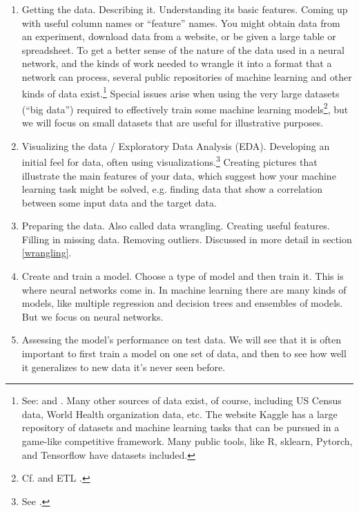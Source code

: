 \begin{enumerate}
\item Getting the data. Describing it. Understanding its basic features. Coming up with useful column names or ``feature'' names. You might obtain data from an experiment, download data from a website, or be given a large table or spreadsheet. To get a better sense of the nature of the data used in a neural network, and the kinds of work needed to wrangle it into a format that a network can process, several public repositories of machine learning and other kinds of data exist.\footnote{See:  and . Many other sources of data exist, of course, including US Census data, World Health organization data, etc. The website Kaggle has a large repository of datasets and machine learning tasks that can be pursued in a game-like competitive framework. Many public tools, like R, sklearn, Pytorch, and Tensorflow have datasets included.}  Special issues arise when using the very large datasets (``big data'') required to effectively train some machine learning models\footnote{Cf.  and ETL .}, but we will focus on small datasets that are useful for illustrative purposes. 
\item Visualizing the data / Exploratory Data Analysis (EDA). Developing an initial feel for  data, often using visualizations.\footnote{See .} Creating pictures that illustrate the main features of your data, which suggest how your machine learning task might be solved, e.g. finding data that show a correlation between some input data and the target data.
\item Preparing the data. Also called data wrangling. Creating useful features. Filling in missing data. Removing outliers. Discussed in more detail in section \ref{wrangling}.
\item Create and train a model. Choose a type of model and then train it. This is where  neural networks come in. In machine learning there are many kinds of models, like multiple regression and decision trees and ensembles of models. But we focus on neural networks.
\item Assessing the model's performance on test data. We will see that it is often important to first train a model on one set of data, and then to see how well it generalizes to new data it's never seen before.
\end{enumerate}


